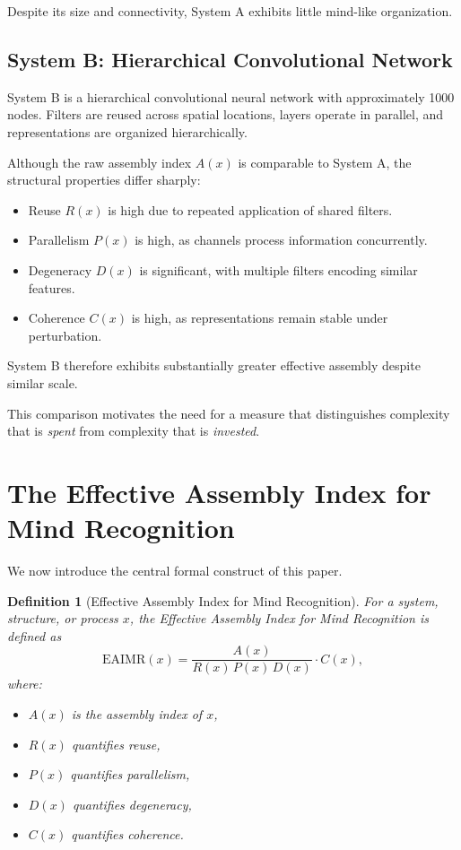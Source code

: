 \documentclass[11pt,letterpaper]{article}
\newtheorem{definition}{Definition}
\begin{document}
Despite its size and connectivity, System A exhibits little mind-like organization.

\subsection{System B: Hierarchical Convolutional Network}

System B is a hierarchical convolutional neural network with approximately 1000 nodes. Filters are reused across spatial locations, layers operate in parallel, and representations are organized hierarchically.

Although the raw assembly index $A(x)$ is comparable to System A, the structural properties differ sharply:
\begin{itemize}
  \item Reuse $R(x)$ is high due to repeated application of shared filters.
  \item Parallelism $P(x)$ is high, as channels process information concurrently.
  \item Degeneracy $D(x)$ is significant, with multiple filters encoding similar features.
  \item Coherence $C(x)$ is high, as representations remain stable under perturbation.
\end{itemize}

System B therefore exhibits substantially greater effective assembly despite similar scale.

This comparison motivates the need for a measure that distinguishes complexity that is \emph{spent} from complexity that is \emph{invested}.

\section{The Effective Assembly Index for Mind Recognition}

We now introduce the central formal construct of this paper.

\begin{definition}[Effective Assembly Index for Mind Recognition]
For a system, structure, or process $x$, the Effective Assembly Index for Mind Recognition is defined as
\[
\mathrm{EAIMR}(x)
=
\frac{A(x)}{R(x)\,P(x)\,D(x)} \cdot C(x),
\]
where:
\begin{itemize}
  \item $A(x)$ is the assembly index of $x$,
  \item $R(x)$ quantifies reuse,
  \item $P(x)$ quantifies parallelism,
  \item $D(x)$ quantifies degeneracy,
  \item $C(x)$ quantifies coherence.
\end{itemize}
\end{definition}
\end{document}
